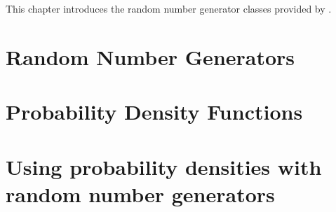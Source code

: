 
This chapter introduces the random number generator classes provided by .

\section{Random Number Generators}

\section{Probability Density Functions}

\section{Using probability densities with random number generators}
